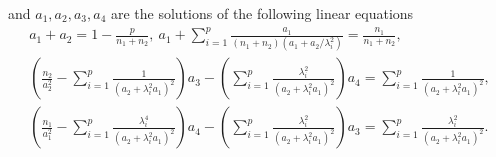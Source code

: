 \begin{theorem}
%
%
	and $a_1, a_2, a_3, a_4$ are the solutions of the following linear equations
	\begin{gather}
		 a_1 + a_2 = 1- \frac{p}{n_1 + n_2},~ a_1 + \sum_{i=1}^p \frac{a_1}{(n_1 + n_2)(a_1 + a_2/ \lambda_i^2)} = \frac{n_1}{n_1 + n_2}, \label{eq_a2} \\
		\left(\frac{n_2}{a_2^2}- \sum_{i=1}^p \frac{1}{ (a_2 + \lambda_i^2a_1)^2  }\right) a_3 -  \left(\sum_{i=1}^p \frac{  \lambda_i^2 }{ (  a_2 + \lambda_i^2a_1)^2  }\right)a_4
		= \sum_{i=1}^p \frac{1 }{ (  a_2 + \lambda_i^2a_1)^2  }, \label{eq_a3} \\
		\left(\frac{n_1}{a_1^2} -  \sum_{i=1}^p \frac{\lambda_i^4   }{  (a_2 + \lambda_i^2a_1)^2  }\right)a_4 -\left(\sum_{i=1}^p \frac{\lambda_i^2  }{  (a_2 + \lambda_i^2a_1)^2  }\right)a_3
		= \sum_{i=1}^p \frac{\lambda_i^2 }{  (a_2 + \lambda_i^2a_1)^2  }. \label{eq_a4}
	\end{gather}
\end{theorem}



